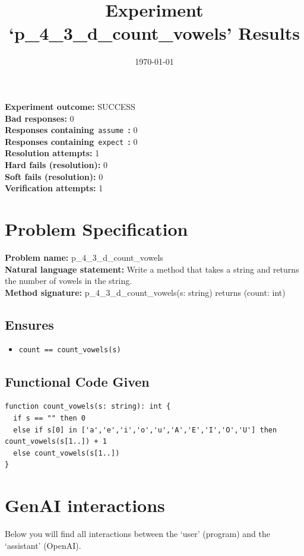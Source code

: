 \documentclass{article}
\begin{document}
\title{Experiment `p\_4\_3\_d\_count\_vowels' Results}
\author{\today}
\date{}
\maketitle
\textbf{Experiment outcome: }SUCCESS
\\\textbf{Bad responses: }0
\\\textbf{Responses containing}~\texttt{assume}~\textbf{: }0
\\\textbf{Responses containing}~\texttt{expect}~\textbf{: }0
\\\textbf{Resolution attempts: }1
\\\textbf{Hard fails (resolution): }0
\\\textbf{Soft fails (resolution): }0
\\\textbf{Verification attempts: }1
\section*{Problem Specification}
\textbf{Problem name: }p\_4\_3\_d\_count\_vowels
\\\textbf{Natural language statement: }Write a method that takes a string and returns the number of vowels in the string.
\\\textbf{Method signature: }p\_4\_3\_d\_count\_vowels(s: string) returns (count: int)
\subsection*{Ensures}
\begin{itemize}
\item \texttt{count == count\_vowels(s) }
\end{itemize}
\subsection*{Functional Code Given}
\begin{lstlisting}
function count_vowels(s: string): int {
  if s == "" then 0
  else if s[0] in ['a','e','i','o','u','A','E','I','O','U'] then count_vowels(s[1..]) + 1
  else count_vowels(s[1..])
}
\end{lstlisting}
\clearpage
\section*{GenAI interactions}
Below you will find all interactions between the `user' (program) and the `assistant' (OpenAI).
\end{document}

